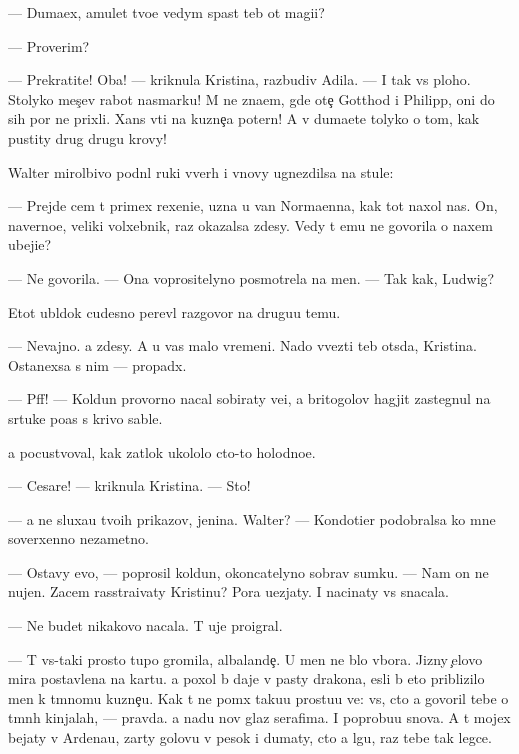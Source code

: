 \documentclass[10pt]{book}
\begin{document}
— Duma{\y}ex, amulet tvo{\y}e{\y} vedym{\yi} spas{\e}t teb{\ia} ot magi{\y}i?

— Proverim?

— Prekratite! Oba! — kriknula Kristina, razbudiv Adila. — I tak vs{\e} ploho. Stolyko mes{\ia}{\c}ev rabot{\yi} nasmarku! M{\yi} ne zna{\y}em, gde ote{\c} Gotthod i Philipp, oni do sih por ne prixli. Xans v{\yi}{\y}ti na kuzne{\c}a poter{\ia}n! A v{\yi} duma{\y}ete tolyko o tom, kak pustity drug drugu krovy!

Walter mirol{\io}bivo podn{\ia}l ruki vverh i vnovy ugnezdilsa na stule:

— Prejde cem t{\yi} primex rexeni{\y}e, uzna{\y} u van Normaenna, kak tot naxol nas. On, naverno{\y}e, veliki{\y} volxebnik, raz okazalsa zdesy. Vedy t{\yi} {\y}emu ne govorila o naxem ubeji{\x}e?

— Ne govorila. — Ona voprositelyno posmotrela na men{\ia}. — Tak kak, Ludwig?

Etot ubl{\io}\-dok cudesno perev{\e}l razgovor na drugu{\y}u temu.

— Nevajno. {\Y}a zdesy. A u vas malo vremeni. Nado v{\yi}vezti teb{\ia} ots{\io}da, Kristina. Ostanexsa s nim — propad{\e}x.

— Pff! — Koldun provorno nacal sobiraty ve{\x}i, a britogolov{\yi}{\y} hagjit zastegnul na s{\io}rtuke po{\y}as s krivo{\y} sable{\y}.

{\Y}a pocustvoval, kak zat{\yi}lok ukololo cto-to holodno{\y}e.

— Cesare! — kriknula Kristina. — Sto{\y}!

— {\Y}a ne sluxa{\y}u tvo{\y}ih prikazov, jen{\x}ina. Walter? — Kondotier podobralsa ko mne soverxenno nezametno.

— Ostavy {\y}evo, — poprosil koldun, okoncatelyno sobrav sumku. — Nam on ne nujen. Zacem rasstra{\y}ivaty Kristinu? Pora u{\y}ezjaty. I nacinaty vs{\e} snacala.

— Ne budet nikakovo nacala. T{\yi} uje proigral.

— T{\yi} vs{\e}-taki prosto tupo{\y} gromila, albalande{\c}. U men{\ia} ne b{\yi}lo v{\yi}bora. Jizny {\c}elovo mira postavlena na kartu. {\Y}a poxol b{\yi} daje v pasty drakona, {\y}esli b{\yi} eto priblizilo men{\ia} k t{\e}mnomu kuzne{\c}u. Kak t{\yi} ne po{\y}m{\e}x taku{\y}u prostu{\y}u ve{\x}: vs{\e}, cto {\y}a govoril tebe o t{\e}mn{\yi}h kinjalah, — pravda. {\Y}a na{\y}du nov{\yi}{\y} glaz serafima. I poprobu{\y}u snova. A t{\yi} mojex bejaty v Ardenau, zar{\yi}ty golovu v pesok i dumaty, cto {\y}a lgu, raz tebe tak legce.
\end{document}
